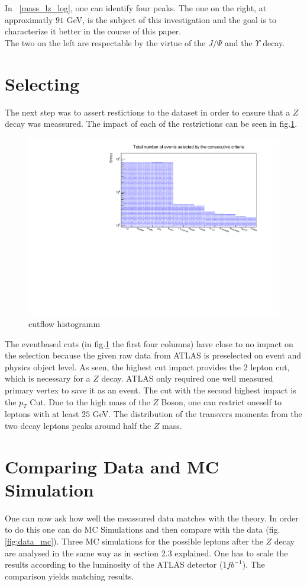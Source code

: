 \documentclass[12pt, a4paper, bibliography=totoc]{scrreprt}
\begin{document}
In ~\ref{mass_lz_log}, one can identify four peaks. 
The one on the right, at approximatly $91$ \si{GeV}, is the subject of this investigation and the goal is to characterize it better in the course of this paper.\\
The two on the left are respectable by the virtue of the $J/{\Psi}$ and the $\Upsilon$ decay. 

\section{Selecting} 
The next step was to assert restictions to the dataset in order to ensure that a $Z$ decay was meassured.
The impact of each of the restrictions can be seen in fig.\ref{fig:cutflow}. 
\begin{figure}[h]
	\centering
	\includegraphics[scale=0.5]{fig/cutflow.pdf}
	\caption{cutflow histogramm}
	\label{fig:cutflow}
\end{figure}
The eventbased cuts (in fig.\ref{fig:cutflow} the first four columns) have close to no impact on the selection because the given raw data from ATLAS is preselected on event and physics object level.
As seen, the highest cut impact provides the 2 lepton cut, which  is necessary for a $Z$ decay. ATLAS only required one well measured primary vertex to save it as an event.
The cut with the second highest impact is the $p_{T}$ Cut. Due to the high mass of the $Z$ Boson, one can restrict oneself to leptons with at least $25$ GeV. The distribution of the transvers momenta from the two decay leptons peaks around half the $Z$ mass. 


\section{Comparing Data and MC Simulation}
One can now ask how well the meassured data matches with the theory. 
In order to do this one can do MC Simulations and then compare with the data (fig. \ref{fig:data_mc}). Three MC simulations for the possible leptons after the $Z$ decay are analysed in the same way as in section 2.3 explained. One has to scale the results according to the luminosity of the ATLAS detector ($1 fb^{-1}$).
The comparison yields matching results.
\end{document}
